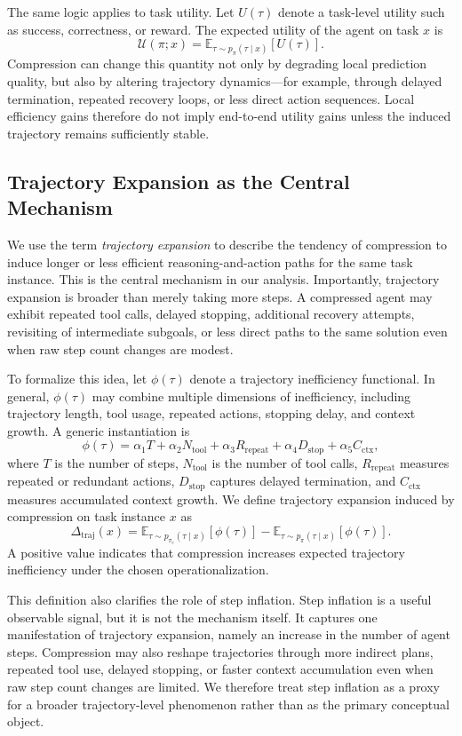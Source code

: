 \documentclass{article}
\begin{document}
The same logic applies to task utility. Let $U(\tau)$ denote a task-level utility such as success, correctness, or reward. The expected utility of the agent on task $x$ is
\[
\mathcal{U}(\pi; x) = \mathbb{E}_{\tau \sim p_{\pi}(\tau \mid x)}[U(\tau)].
\]
Compression can change this quantity not only by degrading local prediction quality, but also by altering trajectory dynamics---for example, through delayed termination, repeated recovery loops, or less direct action sequences. Local efficiency gains therefore do not imply end-to-end utility gains unless the induced trajectory remains sufficiently stable.

\subsection{Trajectory Expansion as the Central Mechanism}

We use the term \emph{trajectory expansion} to describe the tendency of compression to induce longer or less efficient reasoning-and-action paths for the same task instance. This is the central mechanism in our analysis. Importantly, trajectory expansion is broader than merely taking more steps. A compressed agent may exhibit repeated tool calls, delayed stopping, additional recovery attempts, revisiting of intermediate subgoals, or less direct paths to the same solution even when raw step count changes are modest.

To formalize this idea, let $\phi(\tau)$ denote a trajectory inefficiency functional. In general, $\phi(\tau)$ may combine multiple dimensions of inefficiency, including trajectory length, tool usage, repeated actions, stopping delay, and context growth. A generic instantiation is
\[
\phi(\tau)
=
\alpha_1 T
+ \alpha_2 N_{\mathrm{tool}}
+ \alpha_3 R_{\mathrm{repeat}}
+ \alpha_4 D_{\mathrm{stop}}
+ \alpha_5 C_{\mathrm{ctx}},
\]
where $T$ is the number of steps, $N_{\mathrm{tool}}$ is the number of tool calls, $R_{\mathrm{repeat}}$ measures repeated or redundant actions, $D_{\mathrm{stop}}$ captures delayed termination, and $C_{\mathrm{ctx}}$ measures accumulated context growth. We define trajectory expansion induced by compression on task instance $x$ as
\[
\Delta_{\mathrm{traj}}(x)
=
\mathbb{E}_{\tau \sim p_{\pi_c}(\tau \mid x)}[\phi(\tau)]
-
\mathbb{E}_{\tau \sim p_{\pi}(\tau \mid x)}[\phi(\tau)].
\]
A positive value indicates that compression increases expected trajectory inefficiency under the chosen operationalization.

This definition also clarifies the role of step inflation. Step inflation is a useful observable signal, but it is not the mechanism itself. It captures one manifestation of trajectory expansion, namely an increase in the number of agent steps. Compression may also reshape trajectories through more indirect plans, repeated tool use, delayed stopping, or faster context accumulation even when raw step count changes are limited. We therefore treat step inflation as a proxy for a broader trajectory-level phenomenon rather than as the primary conceptual object.
\end{document}
